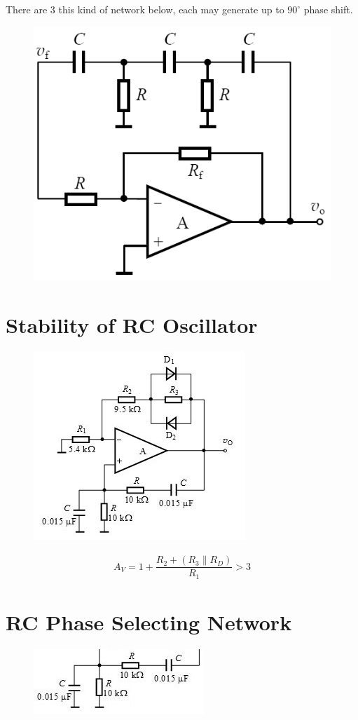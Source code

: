 There are 3 this kind of network below, each may generate up to $90^{\circ}$ phase shift.

\begin{figure}[H]
  \centering
  \includegraphics[width=0.5\linewidth]{figures/RC-Phase-Shifting}
\end{figure}

\section{Stability of RC Oscillator}

\begin{figure}[H]
  \centering
  \includegraphics[width=0.5\linewidth]{figures/Stability-RC-Oscillator}
\end{figure}

\begin{equation*}
  \begin{aligned}
    A_V = 1 + \dfrac{R_2 + \left( R_3 \parallel R_D \right)}{R_1} > 3 
  \end{aligned}
\end{equation*}

\section{RC Phase Selecting Network}

\begin{figure}[H]
  \centering
  \includegraphics[width=0.5\linewidth]{figures/RC-Selecting-Network}
\end{figure}

